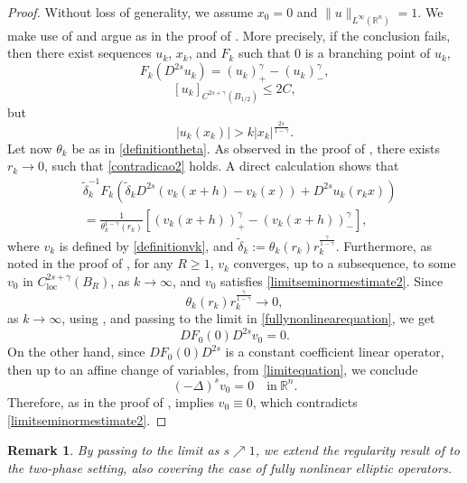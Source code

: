 \documentclass[11pt,reqno]{amsart}
\newtheorem{remark}{Remark}
\numberwithin{equation}{section}
\numberwithin{theorem}{section}
\numberwithin{lemma}{section}
\numberwithin{corollary}{section}
\numberwithin{remark}{section}
\numberwithin{proposition}{section}
\numberwithin{definition}{section}
\newcommand{\R}{\mathbb{R}}
\newcommand{\loc}{\operatorname{loc}}
\begin{document}
\begin{proof}
    Without loss of generality, we assume $x_0=0$ and $\|u\|_{L^\infty(\R^n)}=1$. We make use of  and argue as in the proof of . More precisely, if the conclusion fails, then there exist sequences $u_k$, $x_k$, and $F_k$ such that $0$ is a branching point of $u_k$,
    $$
    F_k( D^{2s}u_k)=(u_k)_+^\gamma-(u_k)_-^\gamma,
    $$
$$
[u_k]_{C^{2s+\gamma}(B_{1/2})}\le2C,
$$
but
\begin{equation*}
    |u_k(x_k)|>k|x_k|^{\frac{2s}{1-\gamma}}.
\end{equation*}
Let now $\theta_k$ be as in \eqref{definitiontheta}. As observed in the proof of , there exists $r_k\to0$, such that \eqref{contradicao2} holds. A direct calculation shows that
\begin{equation}\label{fullynonlinearequation}
    \begin{split}
        &\tilde{\delta}_k^{-1}F_k(\tilde{\delta}_k D^{2s}(v_k(x+h)-v_k(x))+D^{2s}u_k(r_kx))\\
        &=\frac{1}{\theta_k^{1-\gamma}(r_k)}\left[\left(v_k(x+h)\right)_+^\gamma-\left(v_k(x+h)\right)_-^\gamma\right],
    \end{split}
\end{equation}
where $v_k$ is defined by \eqref{definitionvk}, and $\tilde{\delta}_k:=\theta_k(r_k)r_k^{\frac{\gamma}{1-\gamma}}$. Furthermore, as noted in the proof of , for any $R\ge1$, $v_k$ converges, up to a subsequence, to some $v_0$ in $C^{2s+\gamma}_{\loc}(B_R)$, as $k\to\infty$, and $v_0$ satisfies \eqref{limitseminormestimate2}. Since
$$
\theta_k(r_k)r_k^{\frac{\gamma}{1-\gamma}} \longrightarrow 0,
$$
as $k\to\infty$, using , and passing to the limit in \eqref{fullynonlinearequation}, we get
\begin{equation}\label{limitequation}
    DF_0(0)D^{2s}v_0=0.
\end{equation}
On the other hand, since $DF_0(0)D^{2s}$ is a constant coefficient linear operator, then up to an affine change of variables, from \eqref{limitequation}, we conclude
$$
(-\Delta)^sv_0=0\quad \textrm{in} \ \R^n.
$$
Therefore, as in the proof of ,  implies $v_0\equiv0$, which contradicts \eqref{limitseminormestimate2}.
\end{proof}

\begin{remark}\label{another remark on one-phase problem}
By passing to the limit as $s\nearrow 1$, we extend the regularity result of \cite{T16} to the two-phase setting, also covering the case of fully nonlinear elliptic operators.
\end{remark}
\end{document}
